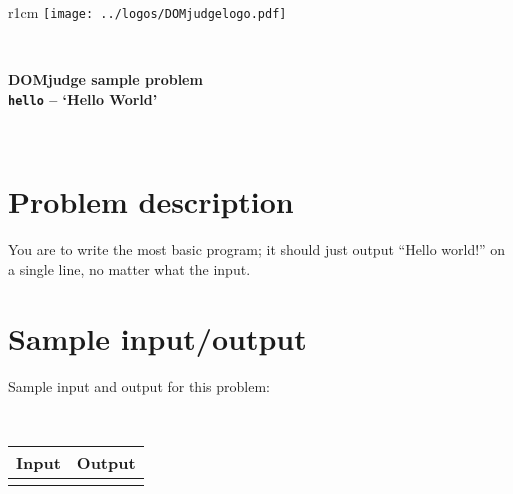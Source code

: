 \documentclass[a4paper,12pt]{article}
\begin{document}
\begin{wrapfigure}[1]{r}{1cm}
  \texttt{[image: ../logos/DOMjudgelogo.pdf]}
\end{wrapfigure}
~\\
\begin{center}
  \Large\bf \textsc{DOM}judge sample problem\\
  \texttt{hello} -- `Hello World'
\end{center}
~\\

\section*{Problem description}

You are to write the most basic program; it should just output ``Hello
world!'' on a single line, no matter what the input.

\section*{Sample input/output}

Sample input and output for this problem:

~\\
\begin{tabular}{|p{}|p{}|}
\hline
\textbf{Input} & \textbf{Output} \\
\hline
 &
 \\
\hline
\end{tabular}
\end{document}
